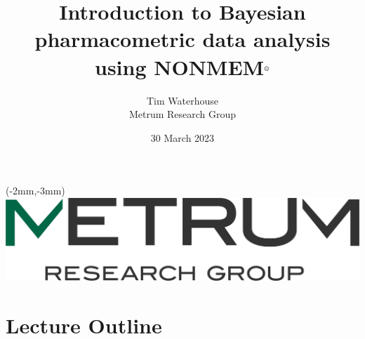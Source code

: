 \documentclass[handout]{beamer}
\title[Bayesian data analysis using NONMEM$^\text{\textregistered}$]{Introduction to
  Bayesian pharmacometric data analysis using NONMEM$^\text{\textregistered}$}
\author{Tim Waterhouse\\
Metrum Research Group}
\date{30 March 2023}
\begin{document}
 
\begin{frame}

\begin{textblock*}{80mm}(-2mm,-3mm)
\includegraphics[scale=0.2]{graphics/metrum_new_logo.png}
\end{textblock*}




\titlepage



\end{frame}

\section{Lecture Outline}

  
\end{document}
